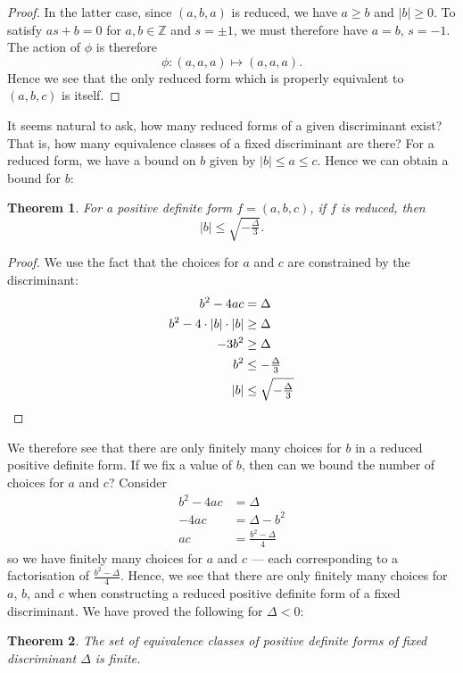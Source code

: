 \documentclass[honours,12pt]{unswthesis}
\newcommand{\Z}{\mathbb{Z}} %
\newtheorem{theorem}{Theorem}[section]
\numberwithin{equation}{section}
\begin{document}
\begin{proof}
    In the latter case, since $(a, b, a)$ is reduced, we have $a \geq b$ and $|b| \geq 0$.
    To satisfy $as + b = 0$ for $a, b \in \Z$ and $s = \pm 1$, we must therefore have $a = b$, $s = -1$.
    The action of $\phi$ is therefore
    $$\phi : (a, a, a) \mapsto (a, a, a).$$
    Hence we see that the only reduced form which is properly equivalent to $(a, b, c)$ is itself.
\end{proof}

It seems natural to ask, how many reduced forms of a given discriminant exist?
That is, how many equivalence classes of a fixed discriminant are there?
For a reduced form, we have a bound on $b$ given by $|b| \leq a \leq c$.
Hence we can obtain a bound for $b$:
\begin{theorem} \label{theorem-b-bound}
    For a positive definite form $f = (a, b, c)$, if $f$ is reduced, then
    $$|b| \leq \sqrt{-\tfrac{\Delta}{3}}.$$
\end{theorem}
\begin{proof}
    We use the fact that the choices for $a$ and $c$ are constrained by the discriminant:
    \begin{align*}
        b^2 - 4ac &= \Delta \\
        b^2 - 4 \cdot |b| \cdot |b| &\geq \Delta \\
        -3b^2 &\geq \Delta \\
        b^2 &\leq -\tfrac{\Delta}{3} \\
        |b| &\leq \sqrt{-\tfrac{\Delta}{3}} \qedhere
    \end{align*}
\end{proof}
We therefore see that there are only finitely many choices for $b$ in a reduced positive definite form.
If we fix a value of $b$, then can we bound the number of choices for $a$ and $c$?
Consider
\begin{align*}
    b^2 - 4ac &= \Delta \\
    -4ac &= \Delta - b^2 \\
    ac &= \frac{b^2 - \Delta}{4}
\end{align*}
so we have finitely many choices for $a$ and $c$ --- each corresponding to a factorisation of $\tfrac{b^2 - \Delta}{4}$.
Hence, we see that there are only finitely many choices for $a$, $b$, and $c$ when constructing a reduced positive definite form of a fixed discriminant.
We have proved the following for $\Delta < 0$:

\vspace{2mm}
\begin{theorem} \label{theorem-class-number-finite}
    The set of equivalence classes of positive definite forms of fixed discriminant $\Delta$ is finite.
\end{theorem}
\end{document}
